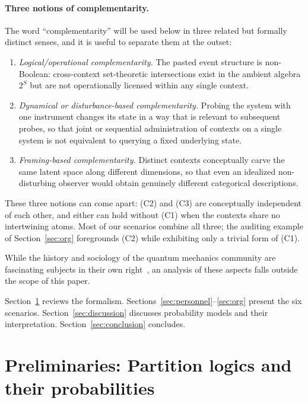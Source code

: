 \documentclass{article}
\begin{document}
\paragraph{Three notions of complementarity.}
The word ``complementarity'' will be used below in three related but
formally distinct senses, and it is useful to separate them at the
outset:
\begin{enumerate}
\item[(C1)] \emph{Logical/operational complementarity.} The pasted
event structure is non-Boolean: cross-context set-theoretic
intersections exist in the ambient algebra $2^S$ but are not
operationally licensed within any single context.
\item[(C2)] \emph{Dynamical or disturbance-based complementarity.}
Probing the system with one instrument changes its state in a way
that is relevant to subsequent probes, so that joint or sequential
administration of contexts on a single system is not equivalent to
querying a fixed underlying state.
\item[(C3)] \emph{Framing-based complementarity.} Distinct contexts
conceptually carve the same latent space along different dimensions,
so that even an idealized non-disturbing observer would obtain
genuinely different categorical descriptions.
\end{enumerate}
These three notions can come apart: (C2) and (C3) are conceptually
independent of each other, and either can hold without (C1) when the
contexts share no intertwining atoms. Most of our scenarios combine
all three; the auditing example of Section~\ref{sec:org} foregrounds
(C2) while exhibiting only a trivial form of (C1).

While the history and sociology of the quantum mechanics community
are fascinating subjects in their own right~\cite{Howard2004-HOWWIT,
Cabello-2015-madness}, an analysis of these aspects falls outside
the scope of this paper.

Section~\ref{sec:prelim} reviews the formalism.
Sections~\ref{sec:personnel}--\ref{sec:org} present the six
scenarios. Section~\ref{sec:discussion} discusses probability
models and their interpretation. Section~\ref{sec:conclusion}
concludes.

\section{Preliminaries: Partition logics and their probabilities}
\label{sec:prelim}
\end{document}
